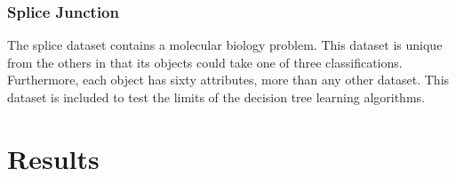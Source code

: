 \documentclass[12pt, letterpaper]{article}
\begin{document}
\subsubsection*{Splice Junction}
The splice dataset contains a molecular biology problem.  This dataset is unique from the others in that
its objects could take one of three classifications.  Furthermore, each object has sixty attributes, more than
any other dataset.  This dataset is included to test the limits of the decision tree learning algorithms.






\section{Results}
\end{document}
